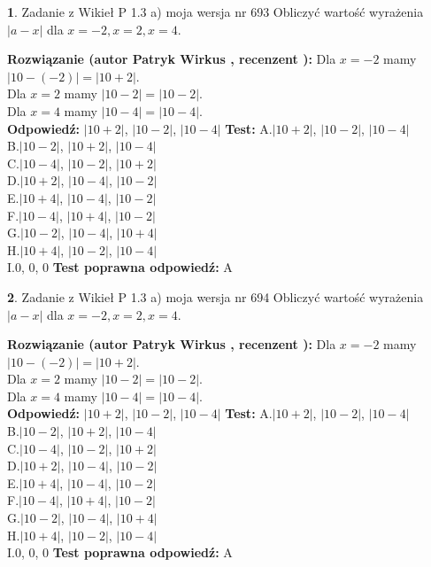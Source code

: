 \documentclass[12pt, a4paper]{article}
\theoremstyle{definition} %
\newtheorem{zad}{}
\newcommand{\zadStart}[1]{\begin{zad}#1\newline}
\newcommand{\zadStop}{\end{zad}}
\newcommand{\rozwStart}[2]{\noindent \textbf{Rozwiązanie (autor #1 , recenzent #2): }\newline}
\newcommand{\rozwStop}{\newline}
\newcommand{\odpStart}{\noindent \textbf{Odpowiedź:}\newline}
\newcommand{\odpStop}{\newline}
\newcommand{\testStart}{\noindent \textbf{Test:}\newline}
\newcommand{\testStop}{\newline}
\newcommand{\kluczStart}{\noindent \textbf{Test poprawna odpowiedź:}\newline}
\newcommand{\kluczStop}{\newline}
\begin{document}
\zadStart{Zadanie z Wikieł P 1.3 a) moja wersja nr 693}
Obliczyć wartość wyrażenia $|a - x|$ dla $x=-2,x=2,x=4$.
\zadStop
\rozwStart{Patryk Wirkus}{}
Dla $x = -2$ mamy $|10 - (-2)| = |10 + 2|$.\\
Dla $x = 2$ mamy $|10 - 2| = |10 - 2|$.\\
Dla $x = 4$ mamy $|10 - 4| = |10 - 4|$.\\
\rozwStop
\odpStart
$|10 + 2|$, $|10 - 2|$, $|10 - 4|$
\odpStop
\testStart
A.$|10 + 2|$, $|10 - 2|$, $|10 - 4|$\\
B.$|10 - 2|$, $|10 + 2|$, $|10 - 4|$\\
C.$|10 - 4|$, $|10 - 2|$, $|10 + 2|$\\
D.$|10 + 2|$, $|10 - 4|$, $|10 - 2|$\\
E.$|10 + 4|$, $|10 - 4|$, $|10 - 2|$\\
F.$|10 - 4|$, $|10 + 4|$, $|10 - 2|$\\
G.$|10 - 2|$, $|10 - 4|$, $|10 + 4|$\\
H.$|10 + 4|$, $|10 - 2|$, $|10 - 4|$\\
I.$0$, $0$, $0$
\testStop
\kluczStart
A
\kluczStop



\zadStart{Zadanie z Wikieł P 1.3 a) moja wersja nr 694}
Obliczyć wartość wyrażenia $|a - x|$ dla $x=-2,x=2,x=4$.
\zadStop
\rozwStart{Patryk Wirkus}{}
Dla $x = -2$ mamy $|10 - (-2)| = |10 + 2|$.\\
Dla $x = 2$ mamy $|10 - 2| = |10 - 2|$.\\
Dla $x = 4$ mamy $|10 - 4| = |10 - 4|$.\\
\rozwStop
\odpStart
$|10 + 2|$, $|10 - 2|$, $|10 - 4|$
\odpStop
\testStart
A.$|10 + 2|$, $|10 - 2|$, $|10 - 4|$\\
B.$|10 - 2|$, $|10 + 2|$, $|10 - 4|$\\
C.$|10 - 4|$, $|10 - 2|$, $|10 + 2|$\\
D.$|10 + 2|$, $|10 - 4|$, $|10 - 2|$\\
E.$|10 + 4|$, $|10 - 4|$, $|10 - 2|$\\
F.$|10 - 4|$, $|10 + 4|$, $|10 - 2|$\\
G.$|10 - 2|$, $|10 - 4|$, $|10 + 4|$\\
H.$|10 + 4|$, $|10 - 2|$, $|10 - 4|$\\
I.$0$, $0$, $0$
\testStop
\kluczStart
A
\kluczStop
\end{document}
